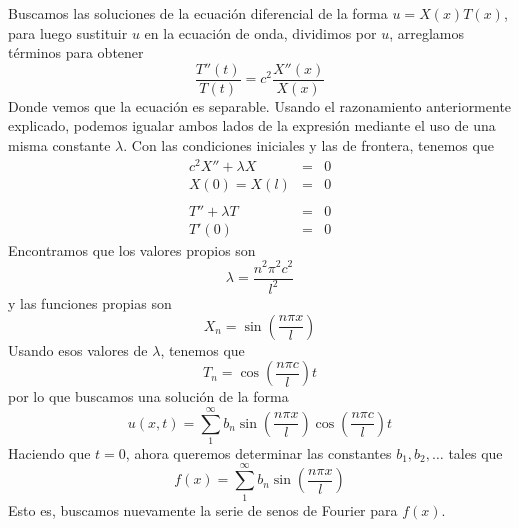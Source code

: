 Buscamos las soluciones de la ecuación diferencial de la forma $u=X(x) T(x)$, para luego sustituir $u$ en la ecuación de onda, dividimos por $u$, arreglamos términos para obtener
\begin{equation}
\dfrac{T''(t)}{T(t)} =  c^{2} \dfrac{X''(x)}{X(x)}
\end{equation}
Donde vemos que la ecuación es separable. Usando el razonamiento anteriormente explicado, podemos igualar ambos lados de la expresión mediante el uso de una misma constante $\lambda$. Con las condiciones iniciales y las de frontera, tenemos que
\begin{eqnarray*}
c^{2} X'' + \lambda X &=& 0 \\
X(0) = X(l) &=& 0 \\
\\
T'' + \lambda T &=& 0\\
T'(0) &=& 0
\end{eqnarray*}
Encontramos que los valores propios son
\begin{equation}
\lambda = \dfrac{n^{2} \pi^{2} c^{2}}{l^{2}}
\end{equation}
y las funciones propias son
\begin{equation}
X_{n} = \sin \left(\dfrac{n \pi x}{l} \right)
\end{equation}
Usando esos valores de $\lambda$, tenemos que
\begin{equation}
T_{n} = \cos \left( \dfrac{n \pi  c}{l} \right) t
\end{equation}
por lo que buscamos una solución de la forma
\begin{equation}
u(x,t) = \sum_{1}^{\infty} b_{n} \sin \left( \dfrac{n \pi x}{l} \right) \cos \left( \dfrac{n \pi c}{l} \right) t
\end{equation}
Haciendo que $t=0$, ahora queremos determinar las constantes $b_{1}, b_{2}, \ldots$ tales que
\begin{equation}
f(x) = \sum_{1}^{\infty} b_{n} \sin \left( \dfrac{n \pi x}{l} \right)
\end{equation}
Esto es, buscamos nuevamente la serie de senos de Fourier para $f(x)$.

